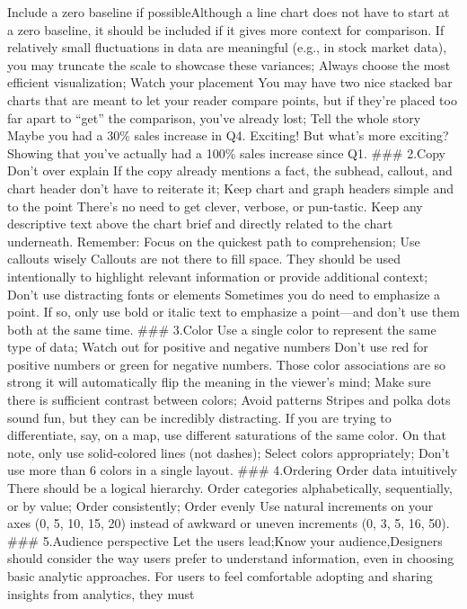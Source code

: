 \documentclass[]{book}
\theoremstyle{definition}
\theoremstyle{definition}
\theoremstyle{definition}
\theoremstyle{remark}
\begin{document}
Include a zero baseline if possibleAlthough a line chart does not have
to start at a zero baseline, it should be included if it gives more
context for comparison. If relatively small fluctuations in data are
meaningful (e.g., in stock market data), you may truncate the scale to
showcase these variances; Always choose the most efficient
visualization; Watch your placement You may have two nice stacked bar
charts that are meant to let your reader compare points, but if they're
placed too far apart to ``get'' the comparison, you've already lost;
Tell the whole story Maybe you had a 30\% sales increase in Q4.
Exciting! But what's more exciting? Showing that you've actually had a
100\% sales increase since Q1. \#\#\# 2.Copy Don't over explain If the
copy already mentions a fact, the subhead, callout, and chart header
don't have to reiterate it; Keep chart and graph headers simple and to
the point There's no need to get clever, verbose, or pun-tastic. Keep
any descriptive text above the chart brief and directly related to the
chart underneath. Remember: Focus on the quickest path to comprehension;
Use callouts wisely Callouts are not there to fill space. They should be
used intentionally to highlight relevant information or provide
additional context; Don't use distracting fonts or elements Sometimes
you do need to emphasize a point. If so, only use bold or italic text to
emphasize a point---and don't use them both at the same time. \#\#\#
3.Color Use a single color to represent the same type of data; Watch out
for positive and negative numbers Don't use red for positive numbers or
green for negative numbers. Those color associations are so strong it
will automatically flip the meaning in the viewer's mind; Make sure
there is sufficient contrast between colors; Avoid patterns Stripes and
polka dots sound fun, but they can be incredibly distracting. If you are
trying to differentiate, say, on a map, use different saturations of the
same color. On that note, only use solid-colored lines (not dashes);
Select colors appropriately; Don't use more than 6 colors in a single
layout. \#\#\# 4.Ordering Order data intuitively There should be a
logical hierarchy. Order categories alphabetically, sequentially, or by
value; Order consistently; Order evenly Use natural increments on your
axes (0, 5, 10, 15, 20) instead of awkward or uneven increments (0, 3,
5, 16, 50). \#\#\# 5.Audience perspective Let the users lead;Know your
audience,Designers should consider the way users prefer to understand
information, even in choosing basic analytic approaches. For users to
feel comfortable adopting and sharing insights from analytics, they must
\end{document}
